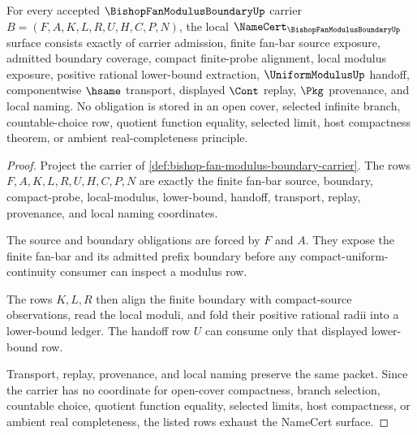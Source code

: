 \begin{theorem}
\label{thm:bishop-fan-modulus-boundary-namecert-obligations}
For every accepted $\BishopFanModulusBoundaryUp$ carrier $B=(F,A,K,L,R,U,H,C,P,N)$, the local $\NameCert_{\BishopFanModulusBoundaryUp}$ surface consists exactly of carrier admission, finite fan-bar source exposure, admitted boundary coverage, compact finite-probe alignment, local modulus exposure, positive rational lower-bound extraction, $\UniformModulusUp$ handoff, componentwise $\hsame$ transport, displayed $\Cont$ replay, $\Pkg$ provenance, and local naming. No obligation is stored in an open cover, selected infinite branch, countable-choice row, quotient function equality, selected limit, host compactness theorem, or ambient real-completeness principle.
\end{theorem}
\begin{proof}
Project the carrier of \autoref{def:bishop-fan-modulus-boundary-carrier}. The rows $F,A,K,L,R,U,H,C,P,N$ are exactly the finite fan-bar source, boundary, compact-probe, local-modulus, lower-bound, handoff, transport, replay, provenance, and local naming coordinates.

The source and boundary obligations are forced by $F$ and $A$. They expose the finite fan-bar and its admitted prefix boundary before any compact-uniform-continuity consumer can inspect a modulus row.

The rows $K,L,R$ then align the finite boundary with compact-source observations, read the local moduli, and fold their positive rational radii into a lower-bound ledger. The handoff row $U$ can consume only that displayed lower-bound row.

Transport, replay, provenance, and local naming preserve the same packet. Since the carrier has no coordinate for open-cover compactness, branch selection, countable choice, quotient function equality, selected limits, host compactness, or ambient real completeness, the listed rows exhaust the NameCert surface.
\end{proof}

